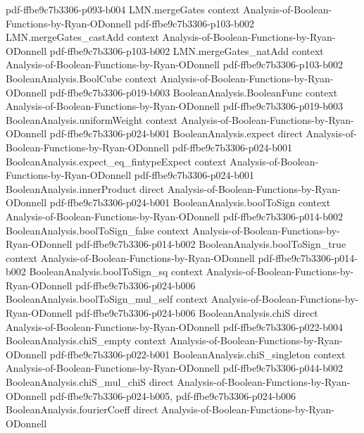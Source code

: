 \begin{lemma}
  {pdf-ffbe9c7b3306-p093-b004}
\proofstep
  {LMN.mergeGates}
  {context}
  {Analysis-of-Boolean-Functions-by-Ryan-ODonnell}
  {pdf-ffbe9c7b3306-p103-b002}
\proofstep
  {LMN.mergeGates_castAdd}
  {context}
  {Analysis-of-Boolean-Functions-by-Ryan-ODonnell}
  {pdf-ffbe9c7b3306-p103-b002}
\proofstep
  {LMN.mergeGates_natAdd}
  {context}
  {Analysis-of-Boolean-Functions-by-Ryan-ODonnell}
  {pdf-ffbe9c7b3306-p103-b002}
\proofstep
  {BooleanAnalysis.BoolCube}
  {context}
  {Analysis-of-Boolean-Functions-by-Ryan-ODonnell}
  {pdf-ffbe9c7b3306-p019-b003}
\proofstep
  {BooleanAnalysis.BooleanFunc}
  {context}
  {Analysis-of-Boolean-Functions-by-Ryan-ODonnell}
  {pdf-ffbe9c7b3306-p019-b003}
\proofstep
  {BooleanAnalysis.uniformWeight}
  {context}
  {Analysis-of-Boolean-Functions-by-Ryan-ODonnell}
  {pdf-ffbe9c7b3306-p024-b001}
\proofstep
  {BooleanAnalysis.expect}
  {direct}
  {Analysis-of-Boolean-Functions-by-Ryan-ODonnell}
  {pdf-ffbe9c7b3306-p024-b001}
\proofstep
  {BooleanAnalysis.expect_eq_fintypeExpect}
  {context}
  {Analysis-of-Boolean-Functions-by-Ryan-ODonnell}
  {pdf-ffbe9c7b3306-p024-b001}
\proofstep
  {BooleanAnalysis.innerProduct}
  {direct}
  {Analysis-of-Boolean-Functions-by-Ryan-ODonnell}
  {pdf-ffbe9c7b3306-p024-b001}
\proofstep
  {BooleanAnalysis.boolToSign}
  {context}
  {Analysis-of-Boolean-Functions-by-Ryan-ODonnell}
  {pdf-ffbe9c7b3306-p014-b002}
\proofstep
  {BooleanAnalysis.boolToSign_false}
  {context}
  {Analysis-of-Boolean-Functions-by-Ryan-ODonnell}
  {pdf-ffbe9c7b3306-p014-b002}
\proofstep
  {BooleanAnalysis.boolToSign_true}
  {context}
  {Analysis-of-Boolean-Functions-by-Ryan-ODonnell}
  {pdf-ffbe9c7b3306-p014-b002}
\proofstep
  {BooleanAnalysis.boolToSign_sq}
  {context}
  {Analysis-of-Boolean-Functions-by-Ryan-ODonnell}
  {pdf-ffbe9c7b3306-p024-b006}
\proofstep
  {BooleanAnalysis.boolToSign_mul_self}
  {context}
  {Analysis-of-Boolean-Functions-by-Ryan-ODonnell}
  {pdf-ffbe9c7b3306-p024-b006}
\proofstep
  {BooleanAnalysis.chiS}
  {direct}
  {Analysis-of-Boolean-Functions-by-Ryan-ODonnell}
  {pdf-ffbe9c7b3306-p022-b004}
\proofstep
  {BooleanAnalysis.chiS_empty}
  {context}
  {Analysis-of-Boolean-Functions-by-Ryan-ODonnell}
  {pdf-ffbe9c7b3306-p022-b001}
\proofstep
  {BooleanAnalysis.chiS_singleton}
  {context}
  {Analysis-of-Boolean-Functions-by-Ryan-ODonnell}
  {pdf-ffbe9c7b3306-p044-b002}
\proofstep
  {BooleanAnalysis.chiS_mul_chiS}
  {direct}
  {Analysis-of-Boolean-Functions-by-Ryan-ODonnell}
  {pdf-ffbe9c7b3306-p024-b005,
    pdf-ffbe9c7b3306-p024-b006}
\proofstep
  {BooleanAnalysis.fourierCoeff}
  {direct}
  {Analysis-of-Boolean-Functions-by-Ryan-ODonnell}

\end{lemma}
